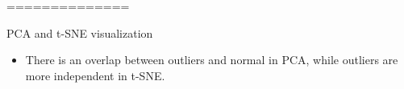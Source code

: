 \documentclass[
 size=14pt,
 paper=smartboard,  %
 mode=present, 		%
 display=slides, 	%
 style=tuliplab,  	%
 pauseslide,
 fleqn,leqno]{powerdot}
\begin{document}
==============
\begin{slide}[toc=,bm=]{PCA and t-SNE visualization}
\begin{itemize}
	\item
	There is an overlap between outliers and normal in PCA, while outliers are more independent in t-SNE.
\end{itemize}
	
\end{slide}
\end{document}
